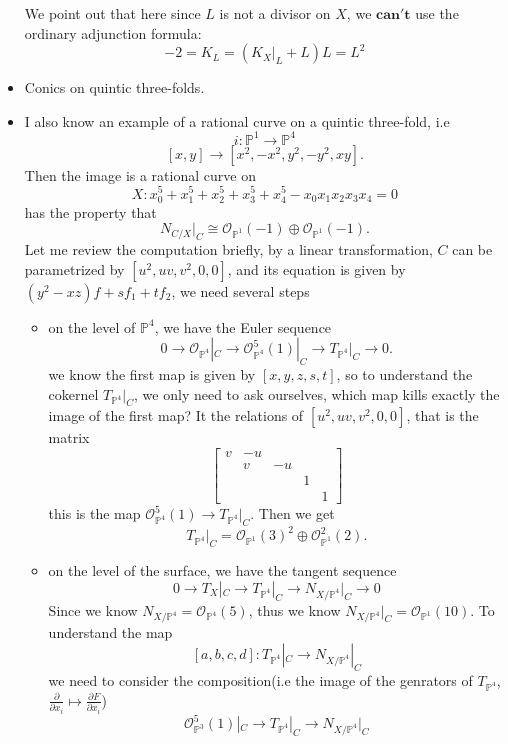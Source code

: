 \documentclass[../main.tex]{subfiles}
\begin{document}
\begin{example}
\begin{itemize}
We point out that here since $L$ is not a divisor on $X$, we $\mathbf{can't}$ use the ordinary adjunction formula:
$$-2=K_{L}=(K_{X}|_{L}+L)L=L^{2}$$
\item Conics on quintic three-folds.
\item I also know an example of a  rational curve on a quintic three-fold, i.e
$$i:\mathbb{P}^{1}\rightarrow \mathbb{P}^{4}$$
$$[x,y]\rightarrow [x^{2},-x^{2},y^{2},-y^{2},xy].$$
Then the image is a rational curve on 
$$X:x_{0}^{5}+x_{1}^{5}+x_{2}^{5}+x_{3}^{5}+x_{4}^{5}-x_{0}x_{1}x_{2}x_{3}x_{4}=0$$
has the property that 
$$N_{C/X}|_{C}\cong \mathcal{O}_{\mathbb{P}^{1}}(-1)\oplus \mathcal{O}_{\mathbb{P}^{1}}(-1). $$
Let me review the computation briefly, by a linear transformation, $C$ can be parametrized by 
$[u^{2},uv,v^{2},0,0]$, and its equation is given by $(y^{2}-xz)f+sf_{1}+tf_{2}$, we need several steps
\begin{itemize}
\item on the level of $\mathbb{P}^{4}$, we have the Euler sequence 
$$0\rightarrow \mathcal{O}_{\mathbb{P}^{4}}|_{C}\rightarrow \mathcal{O}_{\mathbb{P}^{4}}^{5}(1)|_{C}\rightarrow T_{\mathbb{P}^{4}}|_{C}\rightarrow 0.$$
we know the first map is given by $[x,y,z,s,t]$, so to understand the cokernel $T_{\mathbb{P}^{4}}|_{C}$, we only need to ask ourselves, which map kills exactly the image of the first map? It the relations of $[u^{2},uv,v^{2},0,0]$, that is the matrix
$$\begin{bmatrix}
v & -u & & & \\
 & v & -u & & \\
 & & & 1 & \\
 & & & & 1
\end{bmatrix}$$
this is the map $\mathcal{O}_{\mathbb{P}^{4}}^{5}(1)\rightarrow T_{\mathbb{P}^{4}}|_{C}$. Then we get $$T_{\mathbb{P}^{4}}|_{C}=\mathcal{O}_{\mathbb{P}^{1}}(3)^{2}\oplus \mathcal{O}_{\mathbb{P}^{1}}^{2}(2).$$
\item on the level of the surface, we have the tangent sequence 
$$0\rightarrow T_{X}|_{C}\rightarrow T_{\mathbb{P}^{4}}|_{C}\rightarrow N_{X/\mathbb{P}^{4}}|_{C}\rightarrow 0$$
Since we know $N_{X/\mathbb{P}^{4}}=\mathcal{O}_{\mathbb{P}^{4}}(5)$, thus we know $N_{X/\mathbb{P}^{4}}|_{C}=\mathcal{O}_{\mathbb{P}^{1}}(10)$. To understand the map
$$[a,b,c,d]: T_{\mathbb{P}^{4}}|_{C}\rightarrow N_{X/\mathbb{P}^{4}}|_{C}$$
we need to consider the composition(i.e the image of the genrators of $T_{\mathbb{P}^{4}}$, $\frac{\partial}{\partial x_{i}}\mapsto \frac{\partial F}{\partial x_{i}}$) 
$$\mathcal{O}_{\mathbb{P}^{3}}^{5}(1)|_{C}\rightarrow T_{\mathbb{P}^{4}}|_{C}\rightarrow N_{X/\mathbb{P}^{4}}|_{C}$$

\end{itemize}
\end{itemize}
\end{example}
\end{document}
